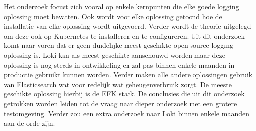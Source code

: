 Het onderzoek focust zich vooral op enkele kernpunten die elke goede logging oplossing moet bevatten. Ook wordt voor elke oplossing getoond hoe de installatie van elke oplossing wordt uitgevoerd. Verder wordt de theorie uitgelegd om deze ook op Kubernetes te installeren en te configureren. Uit dit onderzoek komt naar voren dat er geen duidelijke meest geschikte open source logging oplossing is. Loki kan als meest geschikte aanschouwd worden maar deze oplossing is nog steeds in ontwikkeling en zal pas binnen enkele maanden in productie gebruikt kunnen worden. Verder maken alle andere oplossingen gebruik van Elasticsearch wat voor redelijk wat geheugenverbruik zorgt. De meeste geschikte oplossing hierbij is de EFK stack. De conclusies die uit dit onderzoek getrokken worden leiden tot de vraag naar dieper onderzoek met een grotere testomgeving. Verder zou een extra onderzoek naar Loki binnen enkele maanden aan de orde zijn.
